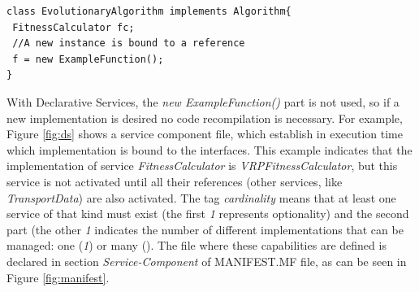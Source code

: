 \documentclass{sig-alternate}
\begin{document}
\begin{lstlisting}
class EvolutionaryAlgorithm implements Algorithm{
 FitnessCalculator fc;
 //A new instance is bound to a reference
 f = new ExampleFunction();
}
\end{lstlisting}
 
With Declarative Services, the {\em new ExampleFunction()} part is not used, so if a new implementation is desired no code recompilation is necessary. For example, Figure \ref{fig:ds} shows a service component file, which establish in execution time which implementation is bound to the interfaces. This example indicates that the implementation of service {\em FitnessCalculator} is {\em VRPFitnessCalculator}, but this service is not activated until all their references (other services, like {\em TransportData}) are also activated. The tag {\em cardinality} means that at least one service of that kind must exist (the first {\em 1} represents optionality) and  the second part (the other {\em 1} indicates the number of different implementations that can be managed: one ({\em 1}) or many ({\em *}). The file where these capabilities are defined is declared in section {\em Service-Component} of MANIFEST.MF file, as can be seen in Figure \ref{fig:manifest}.
\end{document}
